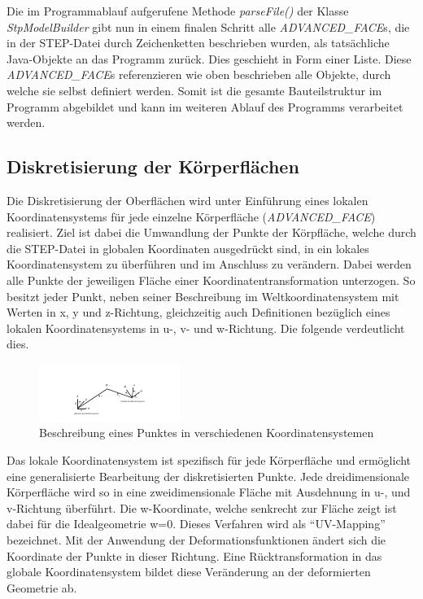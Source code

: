 Die im Programmablauf aufgerufene Methode \textit{parseFile()} der Klasse \textit{StpModelBuilder} gibt nun in einem finalen Schritt alle \textit{ADVANCED\_FACE}s, die in der STEP-Datei durch Zeichenketten beschrieben wurden, als tatsächliche Java-Objekte an das Programm zurück. Dies geschieht in Form einer Liste.  Diese \textit{ADVANCED\_FACE}s  referenzieren wie oben beschrieben alle Objekte, durch welche sie selbst definiert werden. Somit ist die gesamte Bauteilstruktur im Programm abgebildet und kann im weiteren Ablauf des Programms verarbeitet werden.

\subsection{Diskretisierung der Körperflächen}

Die Diskretisierung der Oberflächen wird unter Einführung eines lokalen Koordinatensystems für jede einzelne Körperfläche (\textit{ADVANCED\_FACE}) realisiert.
Ziel ist dabei die Umwandlung der Punkte der Körpfläche, welche durch die STEP-Datei in globalen Koordinaten ausgedrückt sind, in ein lokales Koordinatensystem zu überführen und im Anschluss zu verändern. Dabei werden alle Punkte der jeweiligen Fläche einer Koordinatentransformation unterzogen. So besitzt jeder Punkt, neben seiner Beschreibung im Weltkoordinatensystem mit Werten in x, y und z-Richtung, gleichzeitig auch Definitionen bezüglich eines lokalen Koordinatensystems in u-, v- und w-Richtung. Die folgende  verdeutlicht dies. 

\begin{figure}[h]
	\centering
	
	\includegraphics[width=0.7\linewidth]{img/basetrafo.pdf}
	
	\caption{Beschreibung eines Punktes in verschiedenen Koordinatensystemen}
	\label{fig:basetrafo}
	
\end{figure}

Das lokale Koordinatensystem ist spezifisch für jede Körperfläche und ermöglicht eine generalisierte Bearbeitung der diskretisierten Punkte. Jede dreidimensionale Körperfläche wird so in eine zweidimensionale Fläche mit Ausdehnung in u-, und v-Richtung überführt. Die w-Koordinate, welche senkrecht zur Fläche zeigt ist dabei für die Idealgeometrie w=0. Dieses Verfahren wird als "`UV-Mapping"' bezeichnet.  Mit der Anwendung der Deformationsfunktionen ändert sich die Koordinate der Punkte in dieser Richtung. Eine Rücktransformation in das globale Koordinatensystem bildet diese Veränderung an der deformierten Geometrie ab.       

